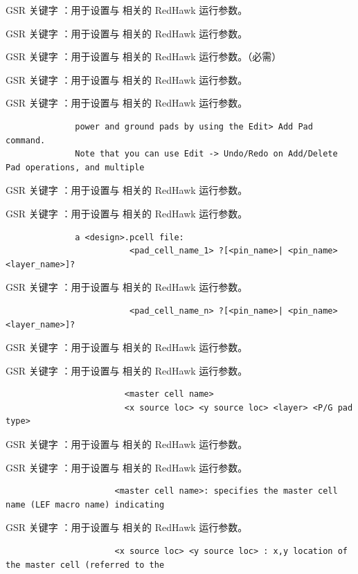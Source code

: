 GSR 关键字 ：用于设置与  相关的 RedHawk 运行参数。

GSR 关键字 ：用于设置与  相关的 RedHawk 运行参数。

GSR 关键字 ：用于设置与  相关的 RedHawk 运行参数。（必需）

GSR 关键字 ：用于设置与  相关的 RedHawk 运行参数。

GSR 关键字 ：用于设置与  相关的 RedHawk 运行参数。

\begin{lstlisting}
              power and ground pads by using the Edit> Add Pad command.
              Note that you can use Edit -> Undo/Redo on Add/Delete Pad operations, and multiple
\end{lstlisting}

GSR 关键字 ：用于设置与  相关的 RedHawk 运行参数。

GSR 关键字 ：用于设置与  相关的 RedHawk 运行参数。

\begin{lstlisting}
              a <design>.pcell file:
                         <pad_cell_name_1> ?[<pin_name>| <pin_name> <layer_name>]?
\end{lstlisting}

GSR 关键字 ：用于设置与  相关的 RedHawk 运行参数。

\begin{lstlisting}
                         <pad_cell_name_n> ?[<pin_name>| <pin_name> <layer_name>]?
\end{lstlisting}

GSR 关键字 ：用于设置与  相关的 RedHawk 运行参数。

GSR 关键字 ：用于设置与  相关的 RedHawk 运行参数。

\begin{lstlisting}
                        <master cell name>
                        <x source loc> <y source loc> <layer> <P/G pad type>
\end{lstlisting}

GSR 关键字 ：用于设置与  相关的 RedHawk 运行参数。

GSR 关键字 ：用于设置与  相关的 RedHawk 运行参数。

\begin{lstlisting}
                      <master cell name>: specifies the master cell name (LEF macro name) indicating
\end{lstlisting}

GSR 关键字 ：用于设置与  相关的 RedHawk 运行参数。

\begin{lstlisting}
                      <x source loc> <y source loc> : x,y location of the master cell (referred to the
\end{lstlisting}

